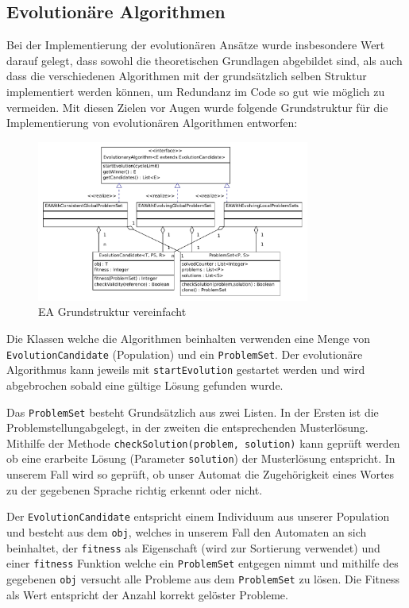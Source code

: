 \subsection{Evolutionäre Algorithmen}
Bei der Implementierung der evolutionären Ansätze wurde insbesondere Wert darauf gelegt, dass sowohl die theoretischen Grundlagen abgebildet sind, als auch dass die verschiedenen Algorithmen mit der grundsätzlich selben Struktur implementiert werden können, um Redundanz im Code so gut wie möglich zu vermeiden. Mit diesen Zielen vor Augen wurde folgende Grundstruktur für die Implementierung von evolutionären Algorithmen entworfen:

\begin{figure}[h]
  \centering
  \includegraphics[width=0.8\textwidth]{images/simple_uml_evolution.pdf}
  \caption[EA Grundstruktur Klassendiagramm]{EA Grundstruktur vereinfacht}
  \label{fig:ea_classdiag_simple}
\end{figure}

Die Klassen welche die Algorithmen beinhalten verwenden eine Menge von \lstinline$EvolutionCandidate$ (Population) und ein \lstinline$ProblemSet$. Der evolutionäre Algorithmus kann jeweils mit \lstinline$startEvolution$ gestartet werden und wird abgebrochen sobald eine gültige Lösung gefunden wurde.

Das \lstinline$ProblemSet$ besteht Grundsätzlich aus zwei Listen. In der Ersten ist die \flqq Problemstellung\frqq abgelegt, in der zweiten die entsprechenden Musterlösung. Mithilfe der Methode \lstinline$checkSolution(problem, solution)$ kann geprüft werden ob eine erarbeite Lösung (Parameter \lstinline$solution$) der Musterlösung entspricht. In unserem Fall wird so geprüft, ob unser Automat die Zugehörigkeit eines Wortes zu der gegebenen Sprache richtig erkennt oder nicht.

Der \lstinline$EvolutionCandidate$ entspricht einem Individuum aus unserer Population und besteht aus dem \lstinline$obj$, welches in unserem Fall den Automaten an sich beinhaltet, der \lstinline$fitness$ als Eigenschaft (wird zur Sortierung verwendet) und einer \lstinline$fitness$ Funktion welche ein \lstinline$ProblemSet$ entgegen nimmt und mithilfe des gegebenen \lstinline$obj$ versucht alle Probleme aus dem \lstinline$ProblemSet$ zu lösen. Die Fitness als Wert entspricht der Anzahl korrekt gelöster Probleme.

